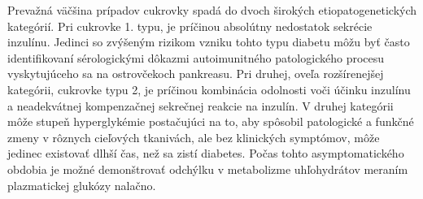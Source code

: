 Prevažná väčšina prípadov cukrovky spadá do dvoch širokých etiopatogenetických kategórií. Pri cukrovke 1. typu, je príčinou absolútny nedostatok sekrécie inzulínu. Jedinci so zvýšeným rizikom vzniku tohto typu diabetu môžu byť často identifikovaní sérologickými dôkazmi autoimunitného patologického procesu vyskytujúceho sa na ostrovčekoch pankreasu. Pri druhej, oveľa rozšírenejšej kategórii, cukrovke typu 2, je príčinou kombinácia odolnosti voči účinku inzulínu a neadekvátnej kompenzačnej sekrečnej reakcie na inzulín. V druhej kategórii môže stupeň hyperglykémie postačujúci na to, aby spôsobil patologické a funkčné zmeny v rôznych cieľových tkanivách, ale bez klinických symptómov, môže jedinec existovať dlhší čas, než sa zistí diabetes. Počas tohto asymptomatického obdobia je možné demonštrovať odchýlku v metabolizme uhľohydrátov meraním plazmatickej glukózy nalačno.\cite{2004}



